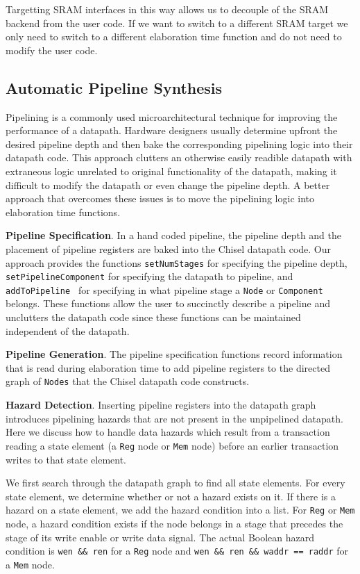 Targetting SRAM interfaces in this way allows us to decouple of the
SRAM backend from the user code. If we want to switch to a different
SRAM target we only need to switch to a different elaboration time
function and do not need to modify the user code.

\subsection{Automatic Pipeline Synthesis}
Pipelining is a commonly used microarchitectural technique for
improving the performance of a datapath. Hardware designers usually
determine upfront the desired pipeline depth and then bake the
corresponding pipelining logic into their datapath code. This approach
clutters an otherwise easily readible datapath with extraneous logic
unrelated to original functionality of the datapath, making it
difficult to modify the datapath or even change the pipeline depth. A
better approach that overcomes these issues is to move the pipelining
logic into elaboration time functions.

{\bf Pipeline Specification}. In a hand coded pipeline, the pipeline
depth and the placement of pipeline registers are baked into the
Chisel datapath code. Our approach provides the functions 
{\tt setNumStages} for specifying the pipeline depth, 
{\tt setPipelineComponent} for specifying the datapath to pipeline,
and {\tt addToPipeline } for specifying in what pipeline stage a {\tt Node}
or {\tt Component} belongs. These functions allow the user to
succinctly describe a pipeline and unclutters the datapath code since
these functions can be maintained independent of the datapath.

{\bf Pipeline Generation}. The pipeline specification functions record
information that is read during elaboration time to add pipeline
registers to the directed graph of {\tt Nodes} that the Chisel datapath
code constructs.

{\bf Hazard Detection}. Inserting pipeline registers into the datapath
graph introduces pipelining hazards that are not present in the
unpipelined datapath. Here we discuss how to handle data hazards which
result from a transaction reading a state element (a {\tt Reg} node or
{\tt Mem} node) before an earlier transaction writes to that state
element. 

We first search through the datapath graph to find all state
elements. For every state element, we determine whether or not a
hazard exists on it. If there is a hazard on a state element, we add
the hazard condition into a list. For {\tt Reg} or {\tt Mem} node, a
hazard condition exists if the node belongs in a stage that precedes the
stage of its write enable or write data signal. The actual Boolean
hazard condition is {\tt wen \&\& ren} for a {\tt Reg} node and
{\tt wen \&\& ren \&\& waddr == raddr} for a {\tt Mem} node.

